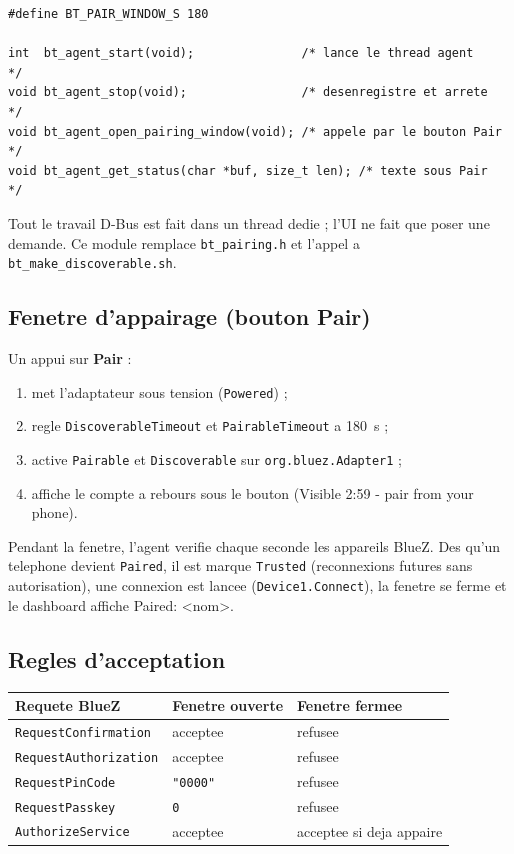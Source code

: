 \documentclass[a4paper,11pt]{article}
\begin{document}
\begin{lstlisting}[style=ccode,caption={bt\_agent.h --- API publique (non bloquante)}]
#define BT_PAIR_WINDOW_S 180

int  bt_agent_start(void);               /* lance le thread agent      */
void bt_agent_stop(void);                /* desenregistre et arrete    */
void bt_agent_open_pairing_window(void); /* appele par le bouton Pair  */
void bt_agent_get_status(char *buf, size_t len); /* texte sous Pair    */
\end{lstlisting}

Tout le travail D-Bus est fait dans un thread dedie ; l'UI ne fait que poser une demande.
Ce module remplace \texttt{bt\_pairing.h} et l'appel a \texttt{bt\_make\_discoverable.sh}.

\subsection{Fenetre d'appairage (bouton Pair)}

Un appui sur \textbf{Pair} :
\begin{enumerate}
  \item met l'adaptateur sous tension (\texttt{Powered}) ;
  \item regle \texttt{DiscoverableTimeout} et \texttt{PairableTimeout} a 180~s ;
  \item active \texttt{Pairable} et \texttt{Discoverable} sur \texttt{org.bluez.Adapter1} ;
  \item affiche le compte a rebours sous le bouton (\og Visible 2:59 - pair from your phone\fg{}).
\end{enumerate}

Pendant la fenetre, l'agent verifie chaque seconde les appareils BlueZ. Des qu'un
telephone devient \texttt{Paired}, il est marque \texttt{Trusted} (reconnexions futures
sans autorisation), une connexion est lancee (\texttt{Device1.Connect}), la fenetre se
ferme et le dashboard affiche \og Paired: <nom>\fg{}.

\subsection{Regles d'acceptation}

\begin{center}
\begin{tabular}{lll}
\toprule
\textbf{Requete BlueZ} & \textbf{Fenetre ouverte} & \textbf{Fenetre fermee} \\
\midrule
\texttt{RequestConfirmation} & acceptee & refusee \\
\texttt{RequestAuthorization} & acceptee & refusee \\
\texttt{RequestPinCode} & \texttt{"0000"} & refusee \\
\texttt{RequestPasskey} & \texttt{0} & refusee \\
\texttt{AuthorizeService} & acceptee & acceptee si deja appaire \\
\bottomrule
\end{tabular}
\end{center}
\end{document}
